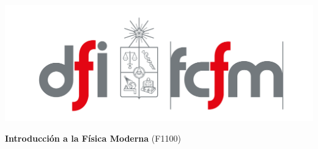 \documentclass[
  11pt,
  letterpaper,
   addpoints,
   answers
  ]{exam}
\begin{document}
\pagestyle{headandfoot}

\noindent
\begin{minipage}{0.47\textwidth}
\includegraphics[width=\textwidth]{../fcfm_die.png}
\end{minipage}
\begin{minipage}{0.53\textwidth}
\begin{center} 
\large\textbf{Introducción a la Física Moderna} (F1100) \\
\end{center}
\end{minipage}

\vspace{0.5cm}
\noindent
\vspace{.85cm}
\end{document}

